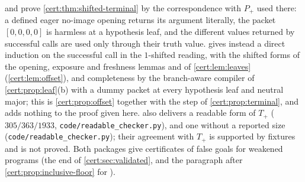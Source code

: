 \begin{remark}\label{cert:rem:shifted-proofs}
 and  prove
\cref{cert:thm:shifted-terminal} by the correspondence with $P_{+}$ used there:
a defined eager no-image opening returns its argument literally, the packet
$[0,0,0,0]$ is harmless at a hypothesis leaf, and the different values returned
by successful calls are used only through their truth value.
 gives instead a direct induction on the successful call
in the $1$-shifted reading, with the shifted forms of the opening, exposure and
freshness lemmas and of \cref{cert:lem:leaves} (\cref{cert:lem:offset}), and
completeness by the branch-aware compiler of \cref{cert:prop:leaf}(b) with a
dummy packet at every hypothesis leaf and neutral major; this is
\cref{cert:prop:offset} together with the step of \cref{cert:prop:terminal},
and adds nothing to the proof given here.  also
delivers a readable form of $T_{+}$ ($305/363/1933$,
\texttt{code/readable\_checker.py}), and  one without a
reported size (\texttt{code/readable\_checker.py}); their agreement with $T_{+}$
is supported by fixtures and is not proved. Both packages give certificates of
false goals for weakened programs (the end of \cref{cert:sec:validated}, and
the paragraph after \cref{cert:prop:inclusive-floor} for ).
\end{remark}


